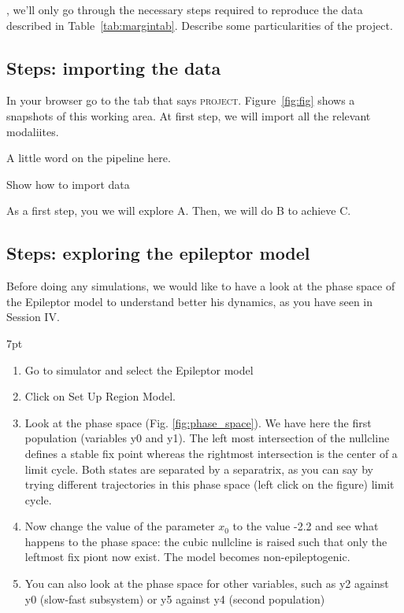 \documentclass{tufte-handout}
\newenvironment{formal}{%
  \def\FrameCommand{%
    \hspace{1pt}%
    {\color{DarkBlue}\vrule width 2pt}%
    {\color{formalshade}\vrule width 4pt}%
    \colorbox{formalshade}%
  }%
  \MakeFramed{\advance\hsize-\width\FrameRestore}%
  \noindent\hspace{-4.55pt}%
  \begin{adjustwidth}{}{7pt}%
  \vspace{2pt}\vspace{2pt}%
}
{%
  \vspace{2pt}\end{adjustwidth}\endMakeFramed%
}
\begin{document}

, we'll only go through the necessary steps
required to reproduce the data described in Table~\ref{tab:margintab}.
Describe some particularities of the project. 


\subsection{Steps: importing the data}\label{sec:import}

In your browser go to the tab that says \textsc{project}.
Figure~\ref{fig:fig} shows a snapshots of this working area.
At first step, we will import all the relevant modaliites.

A little word on the pipeline here.

Show how to import data

As a first step, you we will explore {\color{RoyalBlue}\textsc{A}}. Then, we
will do {\color{RoyalBlue} \textsc{B}} to achieve
{\color{RoyalBlue} \textsc{C}}.





\subsection{Steps: exploring the epileptor model}\label{sec:epileptor}

Before doing any simulations, we would like to have a look at the phase space of the Epileptor model
to understand better his dynamics, as you have seen in Session IV.

\begin{formal}
  \begin{enumerate}[resume]
  \item Go to simulator and select the Epileptor model
  \item Click on Set Up Region Model.
  \item Look at the phase space (Fig. \ref{fig:phase_space}). We have here the first population (variables y0 and y1).
  The left most intersection of the nullcline defines a stable fix point whereas the rightmost intersection 
  is the center of a limit cycle. Both states are separated by a separatrix, as you can say by trying different trajectories
  in this phase space (left click on the figure) limit cycle.
  \item Now change the value of the parameter $x_0$ to the value -2.2 and see what happens to the phase space: the cubic nullcline
  is raised such that only the leftmost fix piont now exist. The model becomes non-epileptogenic.
  \item You can also look at the phase space for other variables, such as y2 against y0 (slow-fast subsystem) or y5 against y4 (second population)
  \end{enumerate}
\end{formal}
\end{document}
